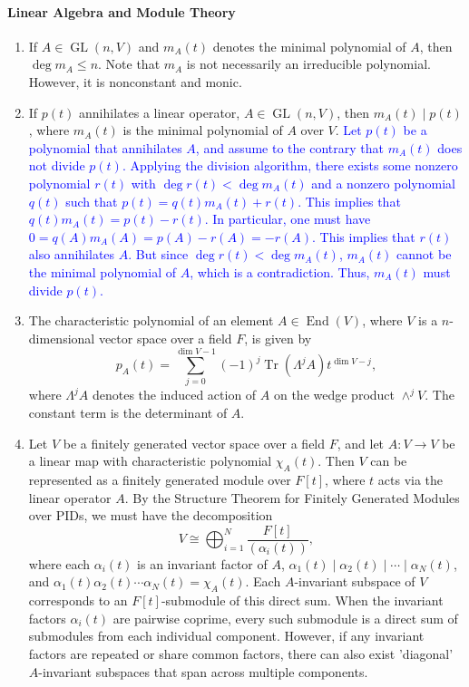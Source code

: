 \documentclass{article}
\newcommand{\expl}[1]{\textcolor{blue}{#1}}
\begin{document}
	\paragraph{Linear Algebra and Module Theory}
	\begin{enumerate}[series = algebra]
		\item If $A \in \operatorname{GL}(n, V)$ and $m_{A}(t)$ denotes the minimal polynomial of $A$, then $\deg{m_A} \leq n$. Note that $m_{A}$ is not necessarily an irreducible polynomial. However, it is nonconstant and monic. 
		\item If $p(t)$ annihilates a linear operator, $A \in \operatorname{GL}(n, V)$, then $m_{A}(t) \mid p(t)$, where $m_{A}(t)$ is the minimal polynomial of $A$ over $V$. \newline \expl{Let $p(t)$ be a polynomial that annihilates $A$, and assume to the contrary that $m_{A}(t)$ does not divide $p(t)$. Applying the division algorithm, there exists some nonzero polynomial $r(t)$ with $\deg{r(t)} < \deg{m_{A}(t)}$ and a nonzero polynomial $q(t)$ such that $p(t) = q(t)m_{A}(t) + r(t)$. This implies that $q(t)m_{A}(t) = p(t) - r(t)$. In particular, one must have $0 = q(A)m_{A}(A) = p(A) - r(A) = -r(A)$. This implies that $r(t)$ also annihilates $A$. But since $\deg{r(t)} < \deg{m_{A}(t)}$, $m_A(t)$ cannot be the minimal polynomial of $A$, which is a contradiction. Thus, $m_{A}(t)$ must divide $p(t)$.}
		\item The characteristic polynomial of an element $A \in \operatorname{End}(V)$, where $V$ is a $n$-dimensional vector space over a field $F$, is given by 
		\begin{equation*}
			p_{A}(t) = \sum_{j = 0}^{\dim{V}-1}(-1)^{j}\operatorname{Tr}(\Lambda^{j}A)t^{\dim{V} - j}, 
		\end{equation*}
		where $\Lambda^{j}A$ denotes the induced action of $A$ on the wedge product $\wedge^{j}V$. The constant term is the determinant of $A$.  
		\item Let $V$ be a finitely generated vector space over a field $F$, and let $A: V \to V$ be a linear map with characteristic polynomial $\chi_{A}(t)$. Then $V$ can be represented as a finitely generated module over $F[t]$, where $t$ acts via the linear operator $A$. By the Structure Theorem for Finitely Generated Modules over PIDs, we must have the decomposition 
		\begin{equation*}
			V \cong \bigoplus_{i = 1}^{N}\frac{F[t]}{(\alpha_{i}(t))}, 
		\end{equation*}
		where each $\alpha_{i}(t)$ is an invariant factor of $A$, $\alpha_{1}(t) \mid \alpha_{2}(t) \mid \dotsm \mid \alpha_{N}(t)$, and $\alpha_{1}(t)\alpha_{2}(t)\dotsm \alpha_{N}(t) = \chi_{A}(t)$. Each $A$-invariant subspace of $V$ corresponds to an $F[t]$-submodule of this direct sum. When the invariant factors $\alpha_i(t)$ are pairwise coprime, every such submodule is a direct sum of submodules from each individual component. However, if any invariant factors are repeated or share common factors, there can also exist 'diagonal' $A$-invariant subspaces that span across multiple components. 

\end{enumerate}
\end{document}
